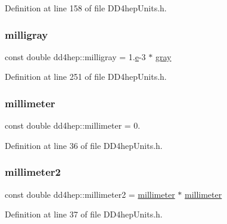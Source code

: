 Definition at line 158 of file D\+D4hep\+Units.\+h.

\hypertarget{namespacedd4hep_abc834abd0eb01594746cfdfd7b91104d}{}\label{namespacedd4hep_abc834abd0eb01594746cfdfd7b91104d} 
\subsubsection{\texorpdfstring{milligray}{milligray}}
{\footnotesize\ttfamily const double dd4hep\+::milligray = 1.\hyperlink{_volumes_8cpp_a8a9a1f93e9b09afccaec215310e64142}{e}-\/3 $\ast$ \hyperlink{namespacedd4hep_a35738d027f0d6649943f74cfc26bb7fc}{gray}\hspace{0.3cm}{\ttfamily [static]}}



Definition at line 251 of file D\+D4hep\+Units.\+h.

\hypertarget{namespacedd4hep_a1b3044c28560621f033b6f0fb9a15854}{}\label{namespacedd4hep_a1b3044c28560621f033b6f0fb9a15854} 
\subsubsection{\texorpdfstring{millimeter}{millimeter}}
{\footnotesize\ttfamily const double dd4hep\+::millimeter = 0.\hspace{0.3cm}{\ttfamily [static]}}



Definition at line 36 of file D\+D4hep\+Units.\+h.

\hypertarget{namespacedd4hep_a1096fbca749064ac09ed44d5a2b37599}{}\label{namespacedd4hep_a1096fbca749064ac09ed44d5a2b37599} 
\subsubsection{\texorpdfstring{millimeter2}{millimeter2}}
{\footnotesize\ttfamily const double dd4hep\+::millimeter2 = \hyperlink{namespacedd4hep_a1b3044c28560621f033b6f0fb9a15854}{millimeter} $\ast$ \hyperlink{namespacedd4hep_a1b3044c28560621f033b6f0fb9a15854}{millimeter}\hspace{0.3cm}{\ttfamily [static]}}



Definition at line 37 of file D\+D4hep\+Units.\+h.

